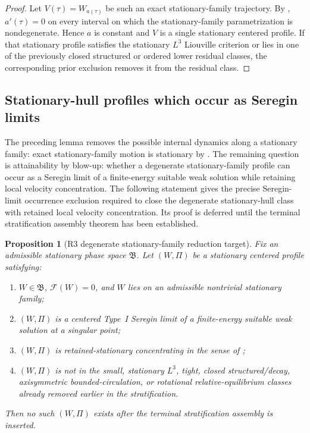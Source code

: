 \documentclass[11pt]{amsart}
\numberwithin{equation}{section}
\theoremstyle{plain}
\newtheorem{proposition}[proposition]{Proposition}
\theoremstyle{definition}
\theoremstyle{remark}
\begin{document}
\begin{proof}
Let \(V(\tau)=W_{a(\tau)}\) be such an exact stationary-family trajectory.  By
, \(a'(\tau)=0\) on every interval on
which the stationary-family parametrization is nondegenerate.  Hence \(a\) is constant and
\(V\) is a single stationary centered profile.  If that stationary profile
satisfies the stationary \(L^3\) Liouville criterion or lies in one of the
previously closed structured or ordered lower residual classes, the corresponding
prior exclusion removes it from the residual class.
\end{proof}

\subsection{Stationary-hull profiles which occur as Seregin limits}

The preceding lemma removes the possible internal dynamics along a stationary
family: exact stationary-family motion is stationary by
.  The remaining question is
attainability by blow-up: whether a degenerate stationary-family profile can
occur as a Seregin limit of a finite-energy suitable weak solution while
retaining local velocity concentration.  The following statement gives the precise
Seregin-limit occurrence exclusion
required to close the degenerate stationary-hull class with retained local
velocity concentration.  Its proof is deferred until the terminal stratification assembly theorem
has been established.

\begin{proposition}[R3 degenerate stationary-family reduction target]
\label{thm:R3-no-attainable-degenerate-family}
Fix an admissible stationary phase space \(\mathfrak B\).  Let \((W,\Pi)\) be a
stationary centered profile satisfying:
\begin{enumerate}[label=(\roman*)]
   \item \(W\in\mathfrak B\), \(\mathcal F(W)=0\), and \(W\) lies on an
      admissible nontrivial stationary family;
   \item \((W,\Pi)\) is a centered Type~I Seregin limit of a finite-energy
      suitable weak solution at a singular point;
   \item \((W,\Pi)\) is retained-stationary concentrating in the sense of
      ;
   \item \((W,\Pi)\) is not in the small, stationary \(L^3\), tight, closed
      structured/decay, axisymmetric bounded-circulation, or rotational
      relative-equilibrium classes already removed earlier in the stratification.
\end{enumerate}
Then no such \((W,\Pi)\) exists after the terminal stratification assembly is
inserted.
\end{proposition}
\end{document}
